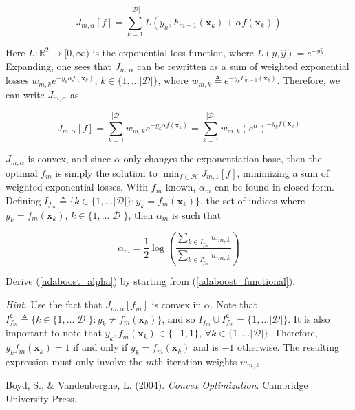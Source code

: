 \documentclass{article}
\numberwithin{equation}{section}
\begin{document}
\begin{enumerate}
    \begin{equation*}
        J_{m, \alpha}[f] = \sum_{k = 1}^{|\mathcal{D}|}
        L(y_k, F_{m - 1}(\mathbf{x}_k) + \alpha f(\mathbf{x}_k))
    \end{equation*}

    Here $ L : \mathbb{R}^2 \rightarrow [0, \infty) $ is the exponential loss
    function, where $ L(y, \hat{y}) = e^{-y\hat{y}} $. Expanding, one sees that
    $ J_{m ,\alpha} $ can be rewritten as a sum of weighted exponential
    losses $ w_{m, k}e^{-y_k\alpha f(\mathbf{x}_k)} $,
    $ k \in \{1, \ldots |\mathcal{D}|\} $, where $ w_{m, k} \triangleq
    e^{-y_kF_{m - 1}(\mathbf{x}_k)} $. Therefore, we can write $ J_{m, \alpha} $
    as

    \begin{equation} \label{adaboost_functional}
        J_{m, \alpha}[f] = \sum_{k = 1}^{|\mathcal{D}|}w_{m, k}
        e^{-y_k\alpha f(\mathbf{x}_k)} =
        \sum_{k = 1}^{|\mathcal{D}|}w_{m, k}(e^\alpha)^{-y_kf(\mathbf{x}_k)}
    \end{equation}

    $ J_{m, \alpha} $ is convex, and since $ \alpha $ only changes the
    exponentiation base, then the optimal $ f_m $ is simply the solution to
    $ \min_{f \in \mathcal{H}}J_{m, 1}[f] $, minimizing a sum of weighted
    exponential losses. With $ f_m $ known, $ \alpha_m $ can be found in closed
    form. Defining
    $ I_{f_m} \triangleq \{k \in \{1, \ldots |\mathcal{D}|\} :
    y_k = f_m(\mathbf{x}_k)\} $, the set of indices where
    $ y_k = f_m(\mathbf{x}_k) $, $ k \in \{1, \ldots |\mathcal{D}|\} $, then
    $ \alpha_m $ is such that

    \begin{equation} \label{adaboost_alpha}
        \alpha_m = \frac{1}{2}\log\left(
            \frac{\sum_{k \in I_{f_m}}w_{m, k}}{
                \sum_{k \in I_{f_m}^\mathsf{c}}w_{m, k}
            }
        \right)
    \end{equation}

    Derive (\ref{adaboost_alpha}) by starting from (\ref{adaboost_functional}).

    \medskip

    \textit{Hint.} Use the fact that $ J_{m, \alpha}[f_m] $ is convex in
    $ \alpha $. Note that $ I_{f_m}^\mathsf{c} \triangleq
    \{k \in \{1, \ldots |\mathcal{D}|\} : y_k \ne f_m(\mathbf{x}_k)\} $, and so
    $ I_{f_m} \cup I_{f_m}^\mathsf{c} = \{1, \ldots |\mathcal{D}|\} $. It is
    also important to note that $ y_k, f_m(\mathbf{x}_k) \in \{-1, 1\} $,
    $ \forall k \in \{1, \ldots |\mathcal{D}|\} $. Therefore,
    $ y_kf_m(\mathbf{x}_k) = 1 $ if and only if $ y_k = f_m(\mathbf{x}_k) $ and
    is $ -1 $ otherwise. The resulting expression must only involve the $ m $th
    iteration weights $ w_{m, k} $.

\end{enumerate}

\begin{thebibliography}{99}
    Boyd, S., \& Vandenberghe, L. (2004). \textit{Convex Optimization}.
    Cambridge University Press.
\end{thebibliography}
\end{document}
